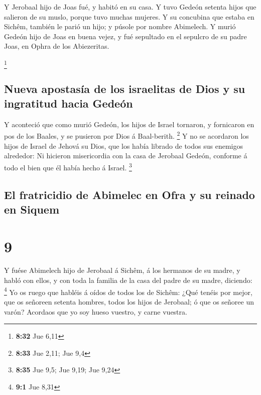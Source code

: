  Y Jerobaal hijo de Joas fué, y habitó en su casa.
 Y tuvo Gedeón setenta hijos que salieron de su muslo,
porque tuvo muchas mujeres.  Y su concubina que estaba en
Sichêm, también le parió un hijo; y púsole por nombre Abimelech.
 Y murió Gedeón hijo de Joas en buena vejez, y fué
sepultado en el sepulcro de su padre Joas, en Ophra de los Abiezeritas.

\footnote{\textbf{8:32} Jue 6,11}

\hypertarget{nueva-apostasuxeda-de-los-israelitas-de-dios-y-su-ingratitud-hacia-gedeuxf3n}{%
\subsection{Nueva apostasía de los israelitas de Dios y su ingratitud
hacia
Gedeón}\label{nueva-apostasuxeda-de-los-israelitas-de-dios-y-su-ingratitud-hacia-gedeuxf3n}}

 Y aconteció que como murió Gedeón, los hijos de Israel
tornaron, y fornicaron en pos de los Baales, y se pusieron por Dios á
Baal-berith. \footnote{\textbf{8:33} Jue 2,11; Jue 9,4}  Y
no se acordaron los hijos de Israel de Jehová su Dios, que los había
librado de todos sus enemigos alrededor:  Ni hicieron
misericordia con la casa de Jerobaal Gedeón, conforme á todo el bien que
él había hecho á Israel. \footnote{\textbf{8:35} Jue 9,5; Jue 9,19; Jue
  9,24}

\hypertarget{el-fratricidio-de-abimelec-en-ofra-y-su-reinado-en-siquem}{%
\subsection{El fratricidio de Abimelec en Ofra y su reinado en
Siquem}\label{el-fratricidio-de-abimelec-en-ofra-y-su-reinado-en-siquem}}

\hypertarget{section-8}{%
\section{9}\label{section-8}}

 Y fuése Abimelech hijo de Jerobaal á Sichêm, á los hermanos
de su madre, y habló con ellos, y con toda la familia de la casa del
padre de su madre, diciendo: \footnote{\textbf{9:1} Jue 8,31}
 Yo os ruego que habléis á oídos de todos los de Sichêm:
¿Qué tenéis por mejor, que os señoreen setenta hombres, todos los hijos
de Jerobaal; ó que os señoree un varón? Acordaos que yo soy hueso
vuestro, y carne vuestra.

